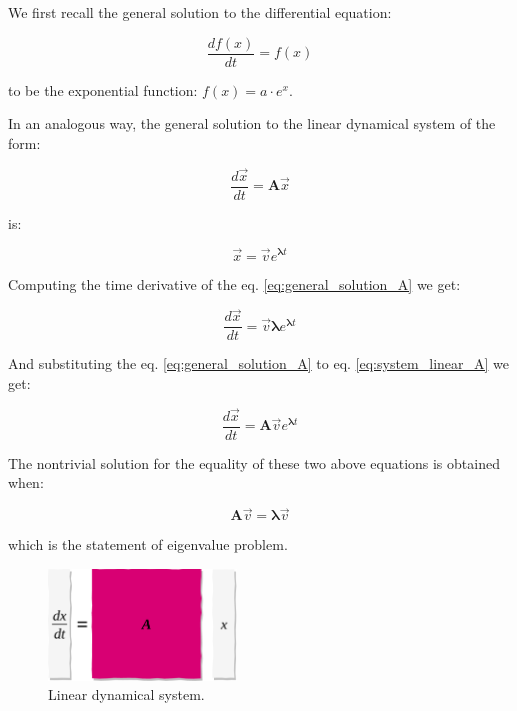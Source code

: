 \documentclass[10pt,twocolumn]{article}
\begin{document}
We first recall the general solution to the differential equation:

\begin{equation} \label{eq:DE_exp}
\frac{d f(x)}{dt} = f(x)
\end{equation}

to be the exponential function: $f(x) = a \cdot e^{x}$.


In an analogous way, the general solution to the linear dynamical system of the form:

\begin{equation} \label{eq:system_linear_A}
\frac{d \vec{x}}{dt} = \bm{A} \vec{x}
\end{equation}

is:

\begin{equation} \label{eq:general_solution_A}
\vec{x} = \vec{v} e^{\bm{\lambda} t}
\end{equation}

Computing the time derivative of the eq. \ref{eq:general_solution_A} we get:

\begin{equation} \label{eq:sub1}
\frac{d \vec{x}}{dt} = \vec{v} \bm{\lambda} e^{\bm{\lambda} t}
\end{equation}

And substituting the eq. \ref{eq:general_solution_A} to eq. \ref{eq:system_linear_A} we get:

\begin{equation} \label{eq:sub2}
\frac{d \vec{x}}{dt} = \bm{A} \vec{v} e^{\bm{\lambda} t}
\end{equation}

The nontrivial solution for the equality of these two above equations is obtained when:

\begin{equation} \label{eq:eigval}
\bm{A} \vec{v} = \bm{\lambda} \vec{v} 
\end{equation}

which is the statement of eigenvalue problem.



\begin{figure}[H]
\centering\includegraphics[width=5cm]{lin-dyn.png}
\caption{Linear dynamical system.}
\label{fig:linear_system}
\end{figure}
\end{document}
